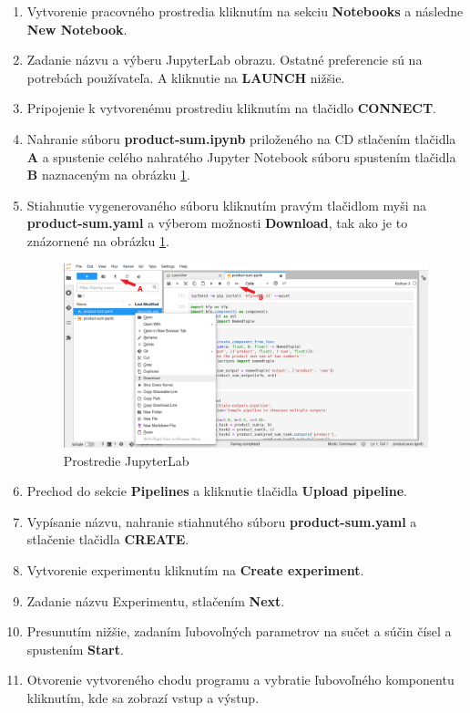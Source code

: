 \begin{enumerate}
\item Vytvorenie pracovného prostredia kliknutím na sekciu \textbf{Notebooks} a následne \textbf{New Notebook}.
\item Zadanie názvu a výberu JupyterLab obrazu. Ostatné preferencie sú na potrebách používateľa. A kliknutie na \textbf{LAUNCH} nižšie.
\item Pripojenie k vytvorenému prostrediu kliknutím na tlačidlo \textbf{CONNECT}.
\item Nahranie súboru \textbf{product-sum.ipynb} priloženého na CD stlačením tlačidla \textbf{A} a spustenie celého nahratého Jupyter Notebook súboru spustením tlačidla \textbf{B} naznaceným na obrázku \ref{tu}.
\item {Stiahnutie vygenerovaného súboru kliknutím pravým tlačidlom myši na \textbf{product-sum.yaml} a výberom možnosti \textbf{Download}, tak ako je to znázornené na obrázku \ref{tu}.
\begin{figure}[!h]
    \centering
    \includegraphics[width=1\linewidth]{figures/4.png}
    \caption{Prostredie JupyterLab}
    \label{tu}
\end{figure}}
\item Prechod do sekcie \textbf{Pipelines} a kliknutie tlačidla \textbf{Upload pipeline}.
\item Vypísanie názvu, nahranie stiahnutého súboru \textbf{product-sum.yaml} a stlačenie tlačidla \textbf{CREATE}.
\item Vytvorenie experimentu kliknutím na \textbf{Create experiment}.
\item Zadanie názvu Experimentu, stlačením \textbf{Next}.
\item Presunutím nižšie, zadaním ľubovoľných parametrov na sučet a súčin čísel a spustením \textbf{Start}.
\item Otvorenie vytvoreného chodu programu a vybratie ľubovoľného komponentu kliknutím, kde sa zobrazí vstup a výstup.
\end{enumerate}